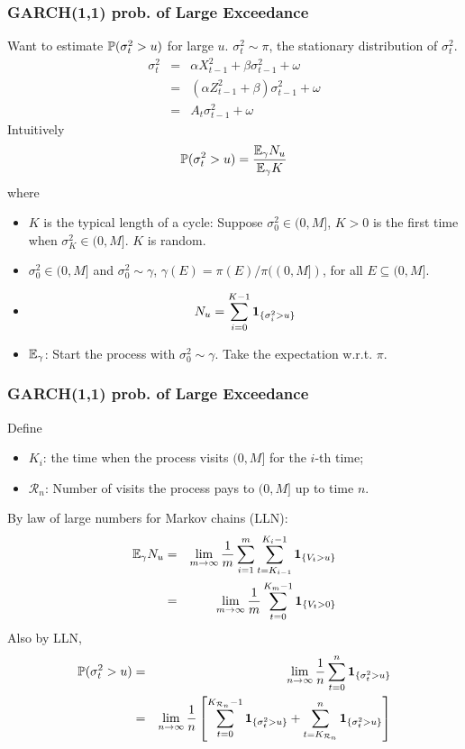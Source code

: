 \documentclass{beamer}
\begin{document}
\begin{frame}
  \frametitle{GARCH(1,1) prob. of Large Exceedance}
  Want to estimate $\P(\sigma_t^2 > u)$ for large $u$. $\sigma_t^2
  \sim \pi$, the stationary distribution of $\sigma_t^2$.
  \begin{eqnarray*}
    \sigma_t^2 &=& \alpha X_{t-1}^2 + \beta \sigma_{t-1}^2 + \omega \\
               &=& (\alpha Z_{t-1}^2 + \beta) \sigma_{t-1}^2 + \omega
    \\
               &=& A_t \sigma_{t-1}^2 + \omega
  \end{eqnarray*}
   Intuitively
   \[
   \P(\sigma^2_t > u) = {
     \E_\gamma N_u
     \over
     \E_\gamma K
   }
   \]
   where
   \begin{footnotesize}
     \begin{itemize}
     \item $K$ is the typical length of a cycle: Suppose $\sigma_0^2 \in
       (0, M]$, $K > 0$ is the first time when $\sigma_K^2 \in
       (0, M]$. $K$ is random.
     \item $\sigma_0^2 \in (0, M]$ and $\sigma_0^2 \sim \gamma$,
       $\gamma(E) = \pi(E) / \pi((0, M])$, for all $E \subseteq (0,
       M]$.
     \item
       \[
       N_u = \sum_{i=0}^{K - 1} \1{\sigma^2_i > u}
       \]
     \item $\E_\gamma$: Start the process with $\sigma_0^2 \sim
       \gamma$. Take the expectation w.r.t. $\pi$.
     \end{itemize}
   \end{footnotesize}
 \end{frame}

 \begin{frame}
   \frametitle{GARCH(1,1) prob. of Large Exceedance}
   Define
   \begin{itemize}
   \item $K_i$: the time when the process visits $(0, M]$ for the
     $i$-th time;
   \item $\mathcal R_n$: Number of visits the process pays to $(0, M]$
     up to time $n$.
   \end{itemize}
   By law of large numbers for Markov chains (LLN):
   \begin{eqnarray*}
     \E_\gamma N_u &=& \lim_{m \to \infty} {1 \over m} \sum_{i=1}^m
                       \sum_{t=K_{i-1}}^{K_i - 1} \1{V_t > u} \\
                   &=& \lim_{m \to \infty} {1 \over m} \sum_{t=0}^{K_m
                       - 1} \1{V_t > 0}
   \end{eqnarray*}
   Also by LLN,
   \begin{eqnarray*}
     \P(\sigma_t^2 > u) &=& \lim_{n \to \infty} {1 \over n} \sum_{t=0}^n \1{\sigma_t^2 > u} \\
     &=& \lim_{n \to \infty}{1 \over n} \left[
         \sum_{t=0}^{K_{\mathcal R_n} - 1} \1{\sigma_t^2 > u}
         +
         \sum_{t=K_{\mathcal R_n}}^{n} \1{\sigma_t^2 > u}
         \right]
   \end{eqnarray*}
 \end{frame}
\end{document}

